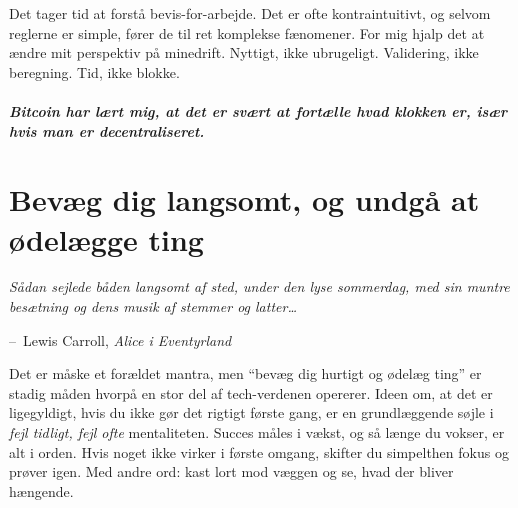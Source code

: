 \documentclass[paper=6in:9in,pagesize=pdftex,headinclude=on,footinclude=on,12pt]{scrbook}
\makeatletter
\newenvironment{chapquote}[2][4em]{\setlength{\@tempdima}{#1}%
   \def\chapquote@author{#2}%
   \parshape 1 \@tempdima \dimexpr\textwidth-2\@tempdima\relax%
   \itshape}{\par\normalfont\hfill--\ \chapquote@author\hspace*{\@tempdima}\par\bigskip}
\makeatother
\begin{document}
Det tager tid at forstå bevis-for-arbejde. Det er ofte kontraintuitivt, og selvom reglerne er simple, fører de til ret komplekse fænomener. For mig hjalp det at ændre mit perspektiv på minedrift. Nyttigt, ikke ubrugeligt. Validering, ikke beregning. Tid, ikke blokke.\paragraph{Bitcoin har lært mig, at det er svært at fortælle hvad klokken er, især hvis man er decentraliseret.}%
%
%
%
%
%
%
%

\chapter{Bevæg dig langsomt, og undgå at ødelægge ting}
\label{les:18}

\begin{chapquote}{Lewis Carroll, \textit{Alice i Eventyrland}} Sådan sejlede båden langsomt af sted, under den lyse sommerdag, med sin muntre besætning og dens musik af stemmer og latter\ldots
\end{chapquote}

Det er måske et forældet mantra, men \enquote{bevæg dig hurtigt og ødelæg ting} er stadig måden hvorpå en stor del af tech-verdenen opererer. Ideen om, at det er ligegyldigt, hvis du ikke gør det rigtigt første gang, er en grundlæggende søjle i \textit{fejl tidligt, fejl ofte} mentaliteten. Succes måles i vækst, og så længe du vokser, er alt i orden. Hvis noget ikke virker i første omgang, skifter du simpelthen fokus og prøver igen. Med andre ord: kast lort mod væggen og se, hvad der bliver hængende.
\end{document}
